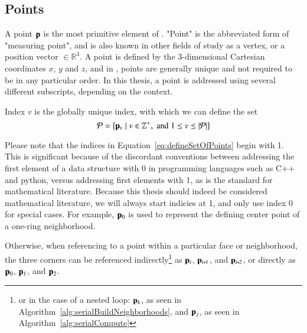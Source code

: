 \subsection{Points}
\label{chBsP}
A point $\mathbf{p}$ is the most primitive element of \tdd{}. "Point" is the abbreviated form of "measuring point", and is also known in other fields of study as a vertex, or a position vector $\in \mathbb{R}^3$. A point is defined by the 3-dimensional Cartesian coordinates $x$, $y$ and $z$, and in \tdd{}, points are generally unique and not required to be in any particular order. In this thesis, a point is addressed using several different subscripts, depending on the context.

Index $v$ is the globally unique index, with which we can define the set
\begin{equation}
	\mathcal{P} = \left \{\mathbf{p}_v \mid v \in \mathbb{Z}^+, \;\text{and}\; 1\leq v \leq|\mathcal{P}| \right \}
	\label{eq:defineSetOfPoints}
\end{equation}%
%
%
%

Please note that the indices in Equation~\ref{eq:defineSetOfPoints} begin with 1. This is significant because of the discordant conventions between addressing the first element of a data structure with 0 in programming languages such as C++ and python, versus addressing first elements with 1, as is the standard for mathematical literature. Because this thesis should indeed be considered mathematical literature, we will always start indicies at 1, and only use index 0 for special cases. For example, $\mathbf{p}_0$ is used to represent the defining center point of a one-ring neighborhood.

Otherwise,
 when referencing to a point within a particular face or neighborhood, the three corners can be referenced indirectly\footnote{or in the case of a nested loop: $\mathbf{p}_k$, as seen in Algorithm~\ref{alg:serialBuildNeighborhoods}, and $\mathbf{p}_j$, as seen in Algorithm~\ref{alg:serialCompute}} as $\mathbf{p}_i$, $\bp_{\sipo}$, and $\bp_{\sipt}$, or directly as $\mathbf{p}_0$, $\mathbf{p}_1$, and $\mathbf{p}_2$.%
%
%
~\cite[p.~25]{Mara12}%
%
